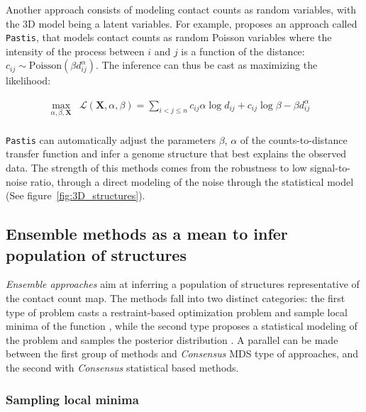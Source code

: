 \documentclass[2columns]{article}
\begin{document}
Another approach consists of modeling contact counts as random variables, with
the 3D model being a latent variables. For example,
\citet{varoquaux:statistical} proposes an approach called
\texttt{Pastis}, that models contact counts as random Poisson variables where
the intensity of the process between $i$ and $j$ is a function of the
distance: $c_{ij} \sim \text{Poisson}(\beta d_{ij}^\alpha)$. The inference can
thus be cast as maximizing the likelihood:

\begin{equation}
\renewcommand{\arraystretch}{2}
\begin{array}{cll}
\underset{\alpha, \beta, \textbf{X}}{\text{max}} &
\mathcal{L}(\mathbf{X}, \alpha, \beta) = \underset{i<j\leq n}{\sum}  c_{ij}
\alpha \log d_{ij} + c_{ij} \log \beta - \beta d_{ij}^\alpha &\\
\end{array}
\end{equation}


\texttt{Pastis} can automatically adjust the parameters $\beta$, $\alpha$ of
the counts-to-distance transfer function and infer a genome structure that
best explains the observed data. The strength of this methods comes from the
robustness to low signal-to-noise ratio, through a direct modeling of the
noise through the statistical model (See figure~\ref{fig:3D_structures}).


\subsection*{Ensemble methods as a mean to infer population of structures}

{\em Ensemble approaches} aim at inferring a population of structures
representative of the contact count map. The methods fall into two distinct
categories: the first type of problem casts a restraint-based 
optimization problem and sample local minima of the function
\citep{bau:three-dimensional, umbarger:three-dimensional}, while the second
type proposes a statistical modeling of the problem and samples the posterior
distribution \citep{rousseau:three, hu:bayesian}. A parallel can be made
between the first group of methods and {\em Consensus} MDS type of approaches,
and the second with {\em Consensus} statistical based methods.

\subsubsection*{Sampling local minima}
\end{document}
